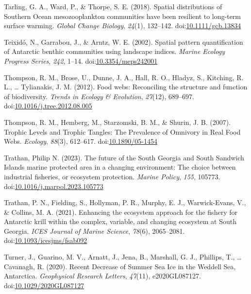 \documentclass[
]{article}
\newlength{\cslhangindent}
\newenvironment{CSLReferences}[2] %
 {\begin{list}{}{%
  \setlength{\itemindent}{0pt}
  \setlength{\leftmargin}{0pt}
  \setlength{\parsep}{0pt}
  \ifodd #1
   \setlength{\leftmargin}{\cslhangindent}
   \setlength{\itemindent}{-1\cslhangindent}
  \fi
  \setlength{\itemsep}{#2\baselineskip}}}
 {\end{list}}
\begin{document}
\begin{CSLReferences}{1}{0}
Tarling, G. A., Ward, P., \& Thorpe, S. E. (2018). Spatial distributions
of {Southern Ocean} mesozooplankton communities have been resilient to
long-term surface warming. \emph{Global Change Biology}, \emph{24}(1),
132--142.
doi:\href{https://doi.org/10.1111/gcb.13834}{10.1111/gcb.13834}

Teixidó, N., Garrabou, J., \& Arntz, W. E. (2002). Spatial pattern
quantification of {Antarctic} benthic communities using landscape
indices. \emph{Marine Ecology Progress Series}, \emph{242}, 1--14.
doi:\href{https://doi.org/10.3354/meps242001}{10.3354/meps242001}

Thompson, R. M., Brose, U., Dunne, J. A., Hall, R. O., Hladyz, S.,
Kitching, R. L., \ldots{} Tylianakis, J. M. (2012). Food webs:
Reconciling the structure and function of biodiversity. \emph{Trends in
Ecology \& Evolution}, \emph{27}(12), 689--697.
doi:\href{https://doi.org/10.1016/j.tree.2012.08.005}{10.1016/j.tree.2012.08.005}

Thompson, R. M., Hemberg, M., Starzomski, B. M., \& Shurin, J. B.
(2007). Trophic {Levels} and {Trophic Tangles}: {The Prevalence} of
{Omnivory} in {Real Food Webs}. \emph{Ecology}, \emph{88}(3), 612--617.
doi:\href{https://doi.org/10.1890/05-1454}{10.1890/05-1454}

Trathan, Philip N. (2023). The future of the {South Georgia} and {South
Sandwich Islands} marine protected area in a changing environment: {The}
choice between industrial fisheries, or ecosystem protection.
\emph{Marine Policy}, \emph{155}, 105773.
doi:\href{https://doi.org/10.1016/j.marpol.2023.105773}{10.1016/j.marpol.2023.105773}

Trathan, P. N., Fielding, S., Hollyman, P. R., Murphy, E. J.,
Warwick-Evans, V., \& Collins, M. A. (2021). Enhancing the ecosystem
approach for the fishery for {Antarctic} krill within the complex,
variable, and changing ecosystem at {South Georgia}. \emph{ICES Journal
of Marine Science}, \emph{78}(6), 2065--2081.
doi:\href{https://doi.org/10.1093/icesjms/fsab092}{10.1093/icesjms/fsab092}

Turner, J., Guarino, M. V., Arnatt, J., Jena, B., Marshall, G. J.,
Phillips, T., \ldots{} Cavanagh, R. (2020). Recent {Decrease} of {Summer
Sea Ice} in the {Weddell Sea}, {Antarctica}. \emph{Geophysical Research
Letters}, \emph{47}(11), e2020GL087127.
doi:\href{https://doi.org/10.1029/2020GL087127}{10.1029/2020GL087127}


\end{CSLReferences}
\end{document}
